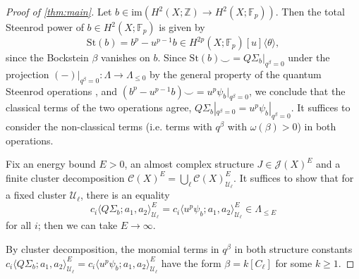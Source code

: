 \documentclass[reqno]{amsart}
\numberwithin{equation}{section}
\numberwithin{equation}{section}
\numberwithin{equation}{section}
\theoremstyle{definition}
\theoremstyle{remark}
\theoremstyle{remark}
\begin{document}

\begin{proof}[Proof of \cref{thm:main}]
    Let $b \in \mathrm{im}(H^2(X;\mathbb{Z}) \to H^2(X;\mathbb{F}_p))$. Then the total Steenrod power of $b \in H^2(X;\mathbb{F}_p)$ is given by
    \begin{equation}
        \mathrm{St}(b) = b^p - u^{p-1}b \in H^{2p}(X;\mathbb{F}_p)[u]\langle \theta \rangle,
    \end{equation}
    since the Bockstein $\beta$ vanishes on $b$. Since $\mathrm{St}(b) \smile = Q\Sigma_b |_{q^\beta =0}$ under the projection $(-)|_{q^\beta=0} : \Lambda \to \Lambda_{\le 0}$ by the general property of the quantum Steenrod operations \cite[Proposition 2.21]{Lee23a}, and $( b^p - u^{p-1} b) \smile = u^p \psi_b |_{q^\beta =0}$, we conclude that the classical terms of the two operations agree,  $Q\Sigma_b |_{q^\beta =0} = u^p  \psi_b |_{q^\beta =0}$. It suffices to consider the non-classical terms (i.e. terms with $q^\beta$ with $\omega(\beta) > 0$) in both operations.

    Fix an energy bound $E> 0$, an almost complex structure $J \in \mathcal{J}(X)^E$ and a finite cluster decomposition $\mathcal{C}(X)^E = \bigcup_{\ell} \mathcal{C}(X)^E_{\mathcal{U}_\ell}$. It suffices to show that for a fixed cluster $\mathcal{U}_\ell$, there is an equality
    \begin{equation}
        c_i \langle Q\Sigma_b ; a_1, a_2 \rangle^E_{\mathcal{U}_{\ell}} =     c_i \langle u^p \psi_b ; a_1, a_2 \rangle^E_{\mathcal{U}_{\ell}} \in \Lambda_{\le E}
    \end{equation}
    for all $i$; then we can take $E \to \infty$. 

    By cluster decomposition, the monomial terms in $q^\beta$ in both structure constants $c_i \langle Q\Sigma_b ; a_1, a_2 \rangle^E_{\mathcal{U}_{\ell}} =     c_i \langle u^p \psi_b ; a_1, a_2 \rangle^E_{\mathcal{U}_{\ell}}$ have the form $\beta = k [C_\ell]$ for some $k \ge 1$.


\end{proof}
\end{document}
